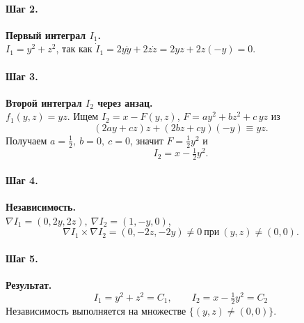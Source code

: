 \paragraph{Шаг 2.} \textbf{Первый интеграл $I_1$.}\\
$I_1=y^2+z^2$, так как $\dot I_1=2y\dot y+2z\dot z=2yz+2z(-y)=0$.

\paragraph{Шаг 3.} \textbf{Второй интеграл $I_2$ через анзац.}\\
$f_1(y,z)=yz$. Ищем $I_2=x-F(y,z)$, $F=a y^2+b z^2+c\,yz$ из
\[
(2a y+c z)z+(2b z+c y)(-y)\equiv yz.
\]
Получаем $a=\tfrac12,\ b=0,\ c=0$, значит $F=\tfrac12 y^2$ и
\[
I_2=x-\tfrac12 y^2.
\]

\paragraph{Шаг 4.} \textbf{Независимость.}\\
$\nabla I_1=(0,2y,2z),\ \nabla I_2=(1,-y,0)$,
\[
\nabla I_1\times\nabla I_2=(0,-2z,-2y)\neq 0 \ \text{при}\ (y,z)\neq(0,0).
\]

\paragraph{Шаг 5.} \textbf{Результат.}\\
\[
\boxed{\,I_1=y^2+z^2=C_1,\qquad I_2=x-\tfrac12 y^2=C_2\,}
\]
Независимость выполняется на множестве $\{(y,z)\neq(0,0)\}$.

